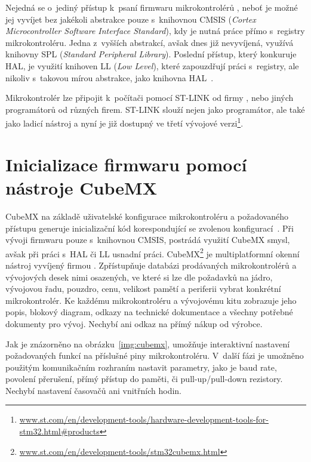     Nejedná se o~jediný přístup k~psaní firmwaru mikrokontrolérů , neboť je možné jej vyvíjet bez jakékoli abstrakce pouze s~knihovnou CMSIS (\textit{Cortex Microcontroller Software Interface Standard}), kdy je nutná práce přímo s~registry mikrokontroléru. Jedna z~vyšších abstrakcí, avšak dnes již nevyvíjená, využívá knihovny SPL (\textit{Standard Peripheral Library}). Poslední přístup, který konkuruje HAL, je využití knihoven LL (\textit{Low Level}), které zapouzdřují práci s~registry, ale nikoliv s~takovou mírou abstrakce, jako knihovna HAL~\cite{root}.

    Mikrokontrolér lze připojit k~počítači pomocí ST-LINK od firmy , nebo jiných programátorů od různých firem. ST-LINK slouží nejen jako programátor, ale také jako ladicí nástroj a nyní je již dostupný ve třetí vývojové verzi\footnote{\url{www.st.com/en/development-tools/hardware-development-tools-for-stm32.html\#products}}.

    \section{Inicializace firmwaru pomocí nástroje CubeMX}
        CubeMX na základě uživatelské konfigurace mikrokontroléru a požadovaného přístupu generuje inicializační kód korespondující se zvolenou konfigurací~\cite{stm:cubemx}.
        Při vývoji firmwaru pouze s~knihovnou CMSIS, postrádá využití CubeMX smysl, avšak při práci s~HAL či LL usnadní práci. CubeMX\footnote{\url{www.st.com/en/development-tools/stm32cubemx.html}} je multiplatformní okenní nástroj vyvíjený firmou . Zpřístupňuje databázi prodávaných mikrokontrolérů  a vývojových desek nimi osazených, ve které si lze dle požadavků na jádro, vývojovou řadu, pouzdro, cenu, velikost pamětí a periferii vybrat konkrétní mikrokontrolér. Ke každému mikrokontroléru a vývojovému kitu zobrazuje jeho popis, blokový diagram, odkazy na technické dokumentace a všechny potřebné dokumenty pro vývoj. Nechybí ani odkaz na přímý nákup od výrobce.

        Jak je znázorněno na obrázku~\ref{img:cubemx}, umožňuje interaktivní nastavení požadovaných funkcí na příslušné piny mikrokontroléru. V~další fázi je umožněno použitým komunikačním rozhraním nastavit parametry, jako je baud rate, povolení přerušení, přímý přístup do paměti, či pull-up/pull-down rezistory. Nechybí nastavení časovačů ani vnitřních hodin.

